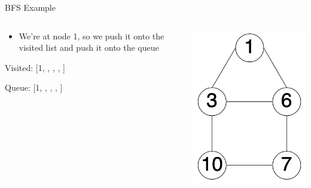 \documentclass[
  ignorenonframetext,
]{beamer}
\providecommand{\tightlist}{%
  \setlength{\itemsep}{0pt}\setlength{\parskip}{0pt}}\usepackage{longtable,booktabs,array}
\begin{document}
\begin{frame}{BFS Example}
\protect\hypertarget{bfs-example-1}{}
\begin{columns}[T]
\begin{column}{0.6\textwidth}
\begin{itemize}
\tightlist
\item
  We're at node 1, so we push it onto the visited list and push it onto
  the queue \vspace{1cm}
\end{itemize}

Visited: {[}1, , , , {]}

Queue: {[}1, , , , {]}
\end{column}

\begin{column}{0.4\textwidth}
\includegraphics{images/graph-bfs.png}
\end{column}
\end{columns}
\end{frame}
\end{document}
